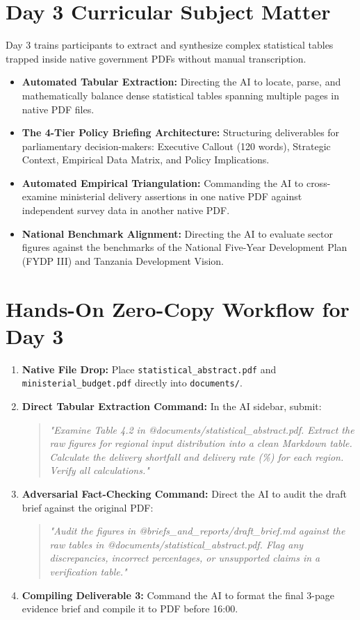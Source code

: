 \documentclass[11pt, a4paper]{report}
\begin{document}
\section{Day 3 Curricular Subject Matter}
Day 3 trains participants to extract and synthesize complex statistical tables trapped inside native government PDFs without manual transcription.
\begin{itemize}[label=-]
    \item \textbf{Automated Tabular Extraction:} Directing the AI to locate, parse, and mathematically balance dense statistical tables spanning multiple pages in native PDF files.
    \item \textbf{The 4-Tier Policy Briefing Architecture:} Structuring deliverables for parliamentary decision-makers: Executive Callout (120 words), Strategic Context, Empirical Data Matrix, and Policy Implications.
    \item \textbf{Automated Empirical Triangulation:} Commanding the AI to cross-examine ministerial delivery assertions in one native PDF against independent survey data in another native PDF.
    \item \textbf{National Benchmark Alignment:} Directing the AI to evaluate sector figures against the benchmarks of the National Five-Year Development Plan (FYDP III) and Tanzania Development Vision.
\end{itemize}

\section{Hands-On Zero-Copy Workflow for Day 3}
\begin{enumerate}[label=\textbf{Step \arabic*:}]
    \item \textbf{Native File Drop:} Place \texttt{statistical\_abstract.pdf} and \texttt{ministerial\_budget.pdf} directly into \texttt{documents/}.
    \item \textbf{Direct Tabular Extraction Command:} In the AI sidebar, submit:
    \begin{quote}
        \small\textit{"Examine Table 4.2 in @documents/statistical\_abstract.pdf. Extract the raw figures for regional input distribution into a clean Markdown table. Calculate the delivery shortfall and delivery rate (\%) for each region. Verify all calculations."}
    \end{quote}
    \item \textbf{Adversarial Fact-Checking Command:} Direct the AI to audit the draft brief against the original PDF:
    \begin{quote}
        \small\textit{"Audit the figures in @briefs\_and\_reports/draft\_brief.md against the raw tables in @documents/statistical\_abstract.pdf. Flag any discrepancies, incorrect percentages, or unsupported claims in a verification table."}
    \end{quote}
    \item \textbf{Compiling Deliverable 3:} Command the AI to format the final 3-page evidence brief and compile it to PDF before 16:00.
\end{enumerate}
\end{document}
